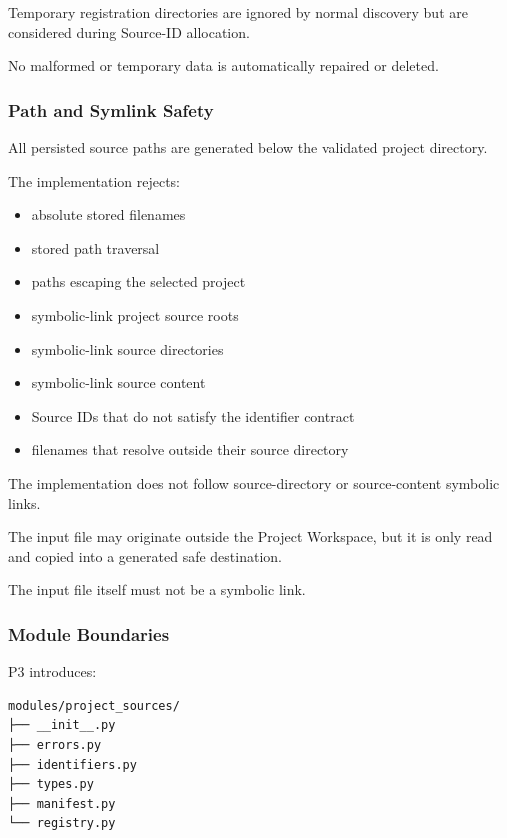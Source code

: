 Temporary registration directories are ignored by normal discovery but are considered during Source-ID allocation.

No malformed or temporary data is automatically repaired or deleted.

\hypertarget{path-and-symlink-safety}{%
\subsubsection{Path and Symlink Safety}\label{path-and-symlink-safety}}

All persisted source paths are generated below the validated project directory.

The implementation rejects:

\begin{itemize}
\tightlist
\item
  absolute stored filenames
\item
  stored path traversal
\item
  paths escaping the selected project
\item
  symbolic-link project source roots
\item
  symbolic-link source directories
\item
  symbolic-link source content
\item
  Source IDs that do not satisfy the identifier contract
\item
  filenames that resolve outside their source directory
\end{itemize}

The implementation does not follow source-directory or source-content symbolic links.

The input file may originate outside the Project Workspace, but it is only read and copied into a generated safe destination.

The input file itself must not be a symbolic link.

\hypertarget{module-boundaries-1}{%
\subsubsection{Module Boundaries}\label{module-boundaries-1}}

P3 introduces:

\begin{verbatim}
modules/project_sources/
├── __init__.py
├── errors.py
├── identifiers.py
├── types.py
├── manifest.py
└── registry.py
\end{verbatim}

